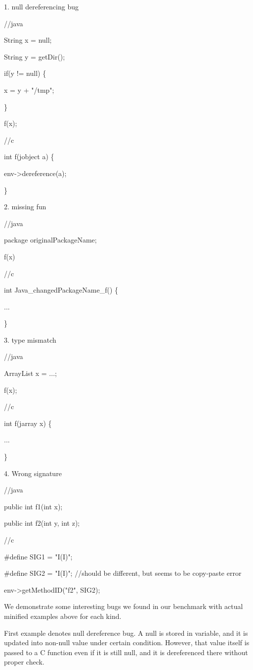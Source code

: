 
1. null dereferencing bug

//java

String x = null;

String y = getDir();

if(y != null) \{
 
 x = y + "/tmp";

\}

f(x);

//c

int f(jobject a) \{

  env->dereference(a);

\}

2. missing fun

//java

package originalPackageName;

f(x)

//c

int Java\_changedPackageName\_f()  \{

  ...

\}

3. type mismatch

//java

ArrayList x = ...;

f(x);

//c

int f(jarray x) \{

  ...

\}

4. Wrong signature

//java

public int f1(int x);

public int f2(int y, int z);

//c

\#define SIG1 = "I(I)";

\#define SIG2 = "I(I)"; //should be different, but seems to be copy-paste error

env->getMethodID("f2", SIG2);

We demonstrate some interesting bugs we found in our benchmark with actual minified examples above
for each kind.

First example denotes null dereference bug. A null is stored in variable, and
it is updated into non-null value under certain condition. However, that value
itself is passed to a C function even if it is still null, and it is dereferenced there
without proper check.

